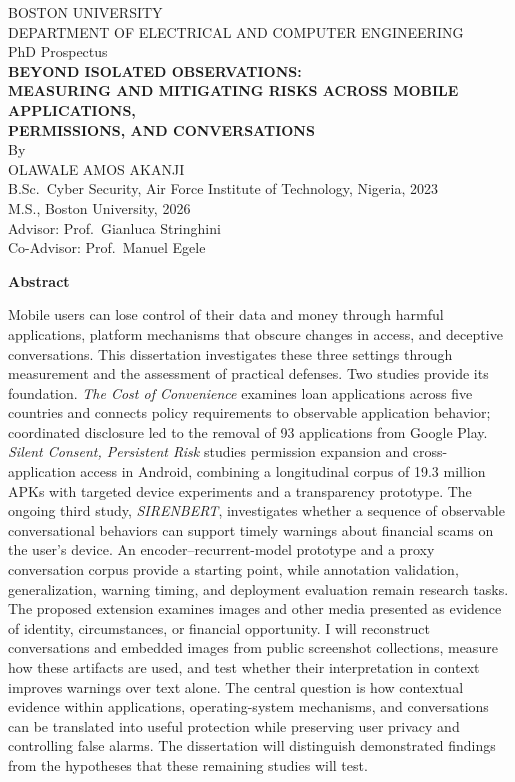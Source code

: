 \documentclass[letterpaper,11pt]{article}
\begin{document}
\begin{titlepage}
\begin{center}
\large BOSTON UNIVERSITY\\[.5em]
DEPARTMENT OF ELECTRICAL AND COMPUTER ENGINEERING\\[1.5em]
PhD Prospectus\\[2em]
{\bfseries BEYOND ISOLATED OBSERVATIONS:\\
MEASURING AND MITIGATING RISKS ACROSS MOBILE APPLICATIONS,\\
PERMISSIONS, AND CONVERSATIONS}\\[2em]
By\\[1em]
OLAWALE AMOS AKANJI\\
B.Sc.\ Cyber Security, Air Force Institute of Technology, Nigeria, 2023\\
M.S., Boston University, 2026\\[1.5em]
Advisor: Prof.\ Gianluca Stringhini\\
Co-Advisor: Prof.\ Manuel Egele
\end{center}
\vfill
\begin{center}\bfseries Abstract\end{center}
\noindent
Mobile users can lose control of their data and money through harmful applications,
platform mechanisms that obscure changes in access, and deceptive conversations.
This dissertation investigates these three settings through measurement and the
assessment of practical defenses. Two studies provide its foundation.
\emph{The Cost of Convenience} examines loan applications across five countries
and connects policy requirements to observable application behavior; coordinated
disclosure led to the removal of 93 applications from Google Play.
\emph{Silent Consent, Persistent Risk} studies permission expansion and
cross-application access in Android, combining a longitudinal corpus of
19.3 million APKs with targeted device experiments and a transparency prototype.
The ongoing third study, \emph{SIRENBERT}, investigates whether a sequence of
observable conversational behaviors can support timely warnings about financial
scams on the user's device. An encoder--recurrent-model prototype and a proxy
conversation corpus provide a starting point, while annotation validation,
generalization, warning timing, and deployment evaluation remain research tasks.
The proposed extension examines images and other media presented as evidence of
identity, circumstances, or financial opportunity. I will reconstruct conversations
and embedded images from public screenshot collections, measure how these
artifacts are used, and test whether their interpretation in context improves
warnings over text alone. The central question is how contextual evidence within
applications, operating-system mechanisms, and conversations can be translated
into useful protection while preserving user privacy and controlling false alarms.
The dissertation will distinguish demonstrated findings
from the hypotheses that these remaining studies will test.
\end{titlepage}
\end{document}
